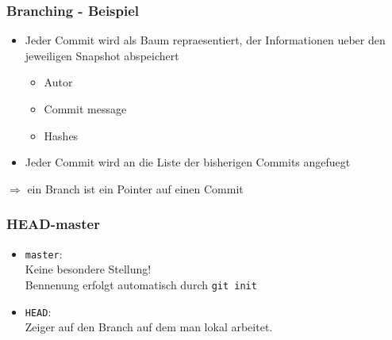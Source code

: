 \documentclass[12pt,utf8]{beamer}
\begin{document}
	\begin{frame}
		\frametitle{Branching - Beispiel}
		\begin{itemize}
			\item Jeder Commit wird als Baum repraesentiert, der Informationen ueber den jeweiligen Snapshot abspeichert
			\begin{itemize}
				\item Autor
				\item Commit message
				\item Hashes
			\end{itemize}
			\item Jeder Commit wird an die Liste der bisherigen Commits angefuegt
		\end{itemize}
		$\Rightarrow$ ein Branch ist ein Pointer auf einen Commit
	\end{frame}

	\begin{frame}
		\frametitle{HEAD-master}
		\begin{itemize}
			\item \texttt{master}:\\
				Keine besondere Stellung!\\
				Bennenung erfolgt automatisch durch \texttt{git init}
			\item \texttt{HEAD}:\\
				Zeiger auf den Branch auf dem man lokal arbeitet.
		\end{itemize}
	\end{frame}

	\begin{frame}
		\begin{figure}[h]
			\centering
		\end{figure}
	\end{frame}
\end{document}

